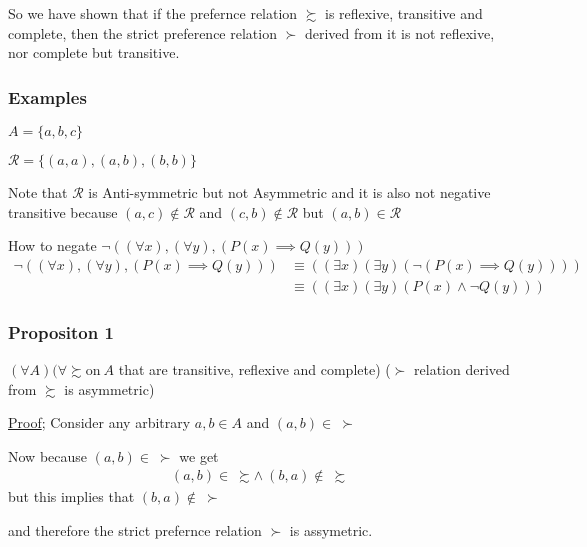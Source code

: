 \documentclass[12pt,a4paper]{article}
\begin{document}
    So we have shown that if the prefernce relation \(\succsim \)  is reflexive, transitive and complete, then the strict preference relation \(\succ \) derived from it is not reflexive, nor complete but transitive.

     \subsubsection*{Examples} 

     \(A =\{a,b,c\} \)
     
     \(\mathcal{R}=\{(a,a),(a,b),(b,b)\} \)  
   
     Note that \(\mathcal{R}\) is Anti-symmetric but not Asymmetric and it is also not negative transitive because \((a,c) \notin \mathcal{R}\) and \((c,b) \notin \mathcal{R}\) but \((a,b) \in \mathcal{R} \)       
   
   How to negate \(\neg\left( \left( \forall x  \right),\left( \forall y \right),\left( P(x) \implies Q(y)\right) \right)\)   
    \begin{align*}
       \neg\left( \left( \forall x  \right),\left( \forall y \right),\left( P(x) \implies Q(y)\right) \right) & \equiv  \left( \left( \exists x \right)\left( \exists y \right) \left( \neg ( P(x) \implies Q(y) ) \right) \right) \\
       & \equiv \left( \left( \exists x \right)\left( \exists y \right) \left( P(x) \wedge \neg Q(y) \right) \right) 
   \end{align*}

    \subsubsection*{Propositon 1} 
    \(\left( \forall A  \right) (\forall \succsim  \text{on} \ A \)
    that are 
    transitive, reflexive and complete) (\(\succ \) relation derived from \(\succsim \) is asymmetric)  

    \begin{tcolorbox}
      \underline{Proof}; Consider any arbitrary \(a,b \in A \) and \((a,b) \in \ \succ \)
      
      Now because \((a,b) \in \ \succ \) we get
       \begin{align*}
        (a,b) \in \ \succsim \wedge \ (b,a) \notin \ \succsim  
      \end{align*}
      but this implies that \((b,a) \notin \ \succ \)  
      
      and therefore the strict prefernce relation \(\succ \) is assymetric. 
    \end{tcolorbox}
    
\end{document}
